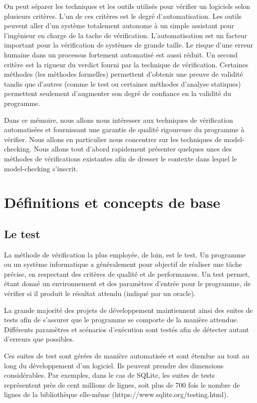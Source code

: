 On peut séparer les techniques et les outils utilisés pour vérifier un
logiciels selon plusieurs critères. L'un de ces critères est le degré
d'automatisation. Les outils peuvent aller d'un système totalement
autonome à un simple assistant pour l'ingénieur en charge de la tache de
vérification. L'automatisation est un facteur important pour la
vérification de systèmes de grande taille. Le risque d'une erreur
humaine dans un processus fortement automatisé est aussi réduit. Un
second critère est la rigueur du verdict fourni par la technique de
vérification. Certaines méthodes (les méthodes formelles) permettent
d'obtenir une preuve de validité tandis que d'autres (comme le test ou
certaines méthodes d'analyse statiques) permettent seulement d'augmenter
son degré de confiance en la validité du programme.

Dans ce mémoire, nous allons nous intéresser aux techniques de
vérification automatisées et fournissant une garantie de qualité
rigoureuse du programme à vérifier. Nous allons en particulier nous
concentrer sur les techniques de model-checking. Nous allons tout
d'abord rapidement présenter quelques unes des méthodes de vérifications
existantes afin de dresser le contexte dans lequel le model-checking
s'inscrit.

\section{Définitions et concepts de base}  %

\subsection{Le test}

La méthode de vérification la plus employée, de loin, est le test. Un
programme ou un système informatique a généralement pour objectif de
réaliser une tâche précise, en respectant des critères de qualité et de
performances. Un test permet, étant donné un environnement et des
paramètres d'entrée pour le programme, de vérifier si il produit le
résultat attendu (indiqué par un oracle).

La grande majorité des projets de développement maintiennent ainsi des
suites de tests afin de s'assurer que le programme se comporte de la
manière attendue. Différents paramètres et scénarios d'exécution sont
testés afin de détecter autant d'erreurs que possibles.

Ces suites de test sont gérées de manière automatisée et sont étendue au
tout au long du développement d'un logiciel. Ils peuvent prendre des
dimensions considérables. Par exemples, dans le cas de SQLite, les
suites de tests représentent près de cent millions de lignes, soit plus
de 700 fois le nombre de lignes de la bibliothèque elle-même
(https://www.sqlite.org/testing.html).

